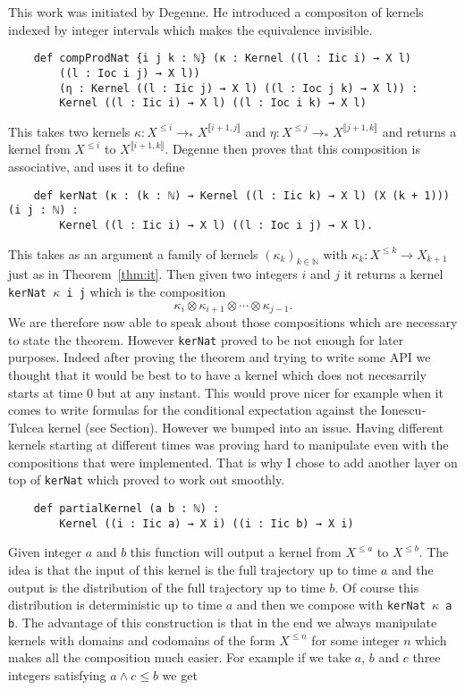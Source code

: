 \documentclass{article}
\newcommand{\N}{\mathbb{N}}
\newcommand{\Xle}[1]{X^{\le#1}}
\newcommand{\Xlen}{X^{\le n}}
\newcommand{\dbrack}[1]{\llbracket #1 \rrbracket}
\newcommand{\ox}{\otimes}
\newcommand{\tost}{\to_*}
\theoremstyle{definition}
\theoremstyle{remark}
\begin{document}
	This work was initiated by Degenne. He introduced a compositon of kernels indexed by integer intervals which makes the equivalence invisible.
	\begin{lstlisting}
	def compProdNat {i j k : ℕ} (κ : Kernel ((l : Iic i) → X l)
		((l : Ioc i j) → X l))
		(η : Kernel ((l : Iic j) → X l) ((l : Ioc j k) → X l)) :
		Kernel ((l : Iic i) → X l) ((l : Ioc i k) → X l)
	\end{lstlisting}
	This takes two kernels $\kappa : \Xle{i} \tost X^{\dbrack{i+1,j}}$ and $\eta : \Xle{j} \tost X^{\dbrack{j+1,k}}$ and returns a kernel from $\Xle{i}$ to $X^{\dbrack{i+1,k}}$. Degenne then proves that this composition is associative, and uses it to define
	\begin{lstlisting}
	def kerNat (κ : (k : ℕ) → Kernel ((l : Iic k) → X l) (X (k + 1))) (i j : ℕ) :
		Kernel ((l : Iic i) → X l) ((l : Ioc i j) → X l).
	\end{lstlisting}
	This takes as an argument a family of kernels $(\kappa_k)_{k\in\N}$ with $\kappa_k : \Xle{k}\to X_{k+1}$ just as in Theorem~\ref{thm:it}. Then given two integers $i$ and $j$ it returns a kernel \texttt{kerNat $\kappa$ i j} which is the composition
	$$\kappa_i \ox \kappa_{i+1} \ox \cdots \ox \kappa_{j-1}.$$
	We are therefore now able to speak about those compositions which are necessary to state the theorem. However \texttt{kerNat} proved to be not enough for later purposes. Indeed after proving the theorem and trying to write some API we thought that it would be best to to have a kernel which does not necesarrily starts at time 0 but at any instant. This  would prove nicer for example when it comes to write formulas for the conditional expectation against the Ionescu-Tulcea kernel (see Section). However we bumped into an issue. Having different kernels starting at different times was proving hard to manipulate even with the compositions that were implemented. That is why I chose to add another layer on top of \texttt{kerNat} which proved to work out smoothly.
	\begin{lstlisting}
	def partialKernel (a b : ℕ) :
		Kernel ((i : Iic a) → X i) ((i : Iic b) → X i)
	\end{lstlisting}
	Given integer $a$ and $b$ this function will output a kernel from $\Xle{a}$ to $\Xle{b}$. The idea is that the input of this kernel is the full trajectory up to time $a$ and the output is the distribution of the full trajectory up to time $b$. Of course this distribution is deterministic up to time $a$ and then we compose with \texttt{kerNat $\kappa$ a b}. The advantage of this construction is that in the end we always manipulate kernels with domains and codomains of the form $\Xlen$ for some integer $n$ which makes all the composition much easier. For example if we take $a$, $b$ and $c$ three integers satisfying $a \land c \le b$ we get
\end{document}
